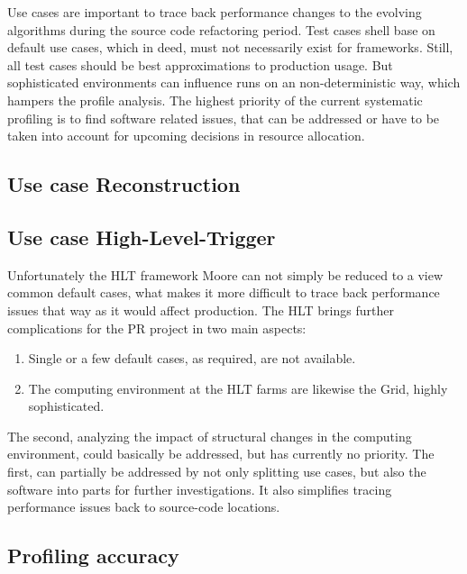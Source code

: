 \documentclass[a4paper]{jpconf}
\begin{document}
Use cases are important to trace back performance changes to the evolving algorithms during the source code refactoring period. Test cases shell base on default use cases, which in deed, must not necessarily exist for frameworks. Still, all test cases should be best approximations to production usage. But sophisticated environments can influence runs on an non-deterministic way, which hampers the profile analysis. The highest priority of the current systematic profiling is to find software related issues, that can be addressed or have to be taken into account for upcoming decisions in resource allocation.

\subsection{Use case Reconstruction}
\label{sec:use_case_rec}

\subsection{Use case High-Level-Trigger}
\label{sec:use_case_hlt}

Unfortunately the HLT framework Moore can not simply be reduced to a view common default cases, what makes it more difficult to trace back performance issues that way as it would affect production. The HLT brings further complications for the PR project in two main aspects:
\begin{enumerate}
 \item Single or a few default cases, as required, are not available.
 \item The computing environment at the HLT farms are likewise the Grid, highly sophisticated.
\end{enumerate}
The second, analyzing the impact of structural changes in the computing environment, could basically be addressed, but has currently no priority. The first, can partially be addressed by not only splitting use cases, but also the software into parts for further investigations. It also simplifies tracing performance issues back to source-code locations. 

\subsection{Profiling accuracy}
\label{sec:profiling accuracy}
\end{document}
